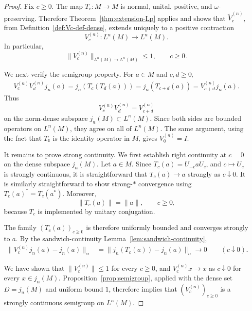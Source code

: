 \documentclass[11pt,a4paper]{article}
\theoremstyle{plain}
\numberwithin{theorem}{section}
\theoremstyle{definition}
\newcommand{\?}{\overset{?}{=}}
\begin{document}
\begin{proof}
Fix \(c\geq0\).  The map \(T_c:M\to M\) is normal, unital, positive,
and \(\omega\)-preserving.  Therefore
Theorem~\ref{thm:extension-Lp} applies and shows that $\widetilde V_c^{(n)}$, from Definition~\ref{def:Vc-def-dense},
extends uniquely to a positive contraction
\[
        V_c^{(n)}:L^n(M)\longrightarrow L^n(M).
\]
In particular,
\begin{equation}
\label{eq:V-contraction}
        \|V_c^{(n)}\|_{L^n(M)\to L^n(M)}
        \leq1,
        \qquad c\geq0.
\end{equation}

We next verify the semigroup property.  For \(a\in M\) and \(c,d\geq0\),
\begin{align*}
        V_c^{(n)}V_d^{(n)}j_n(a)=
        j_n(T_c(T_d(a)))=
        j_n(T_{c+d}(a))=
        V_{c+d}^{(n)}j_n(a).
\end{align*}
Thus
\[
        V_c^{(n)}V_d^{(n)}
        =
        V_{c+d}^{(n)}
\]
on the norm-dense subspace \(j_n(M)\subset L^n(M)\).  Since both sides are
bounded operators on \(L^n(M)\), they agree on all of \(L^n(M)\).  The same
argument, using the fact that \(T_0\) is the identity operator in $M$, gives
\(V_0^{(n)}=I\).

It remains to prove strong continuity.  We first establish right continuity
at \(c=0\) on the dense subspace \(j_n(M)\).  Let \(a\in M\).  Since $T_c(a)=U_{-c}aU_c$,
and \(c\mapsto U_c\) is strongly continuous,  it is straightforward that $T_c(a) \to a$ strongly as $c\downarrow0$.
It is similarly straightforward to show strong-\(*\) convergence using
\(T_c(a)^*=T_c(a^*)\).  Moreover,
\[
        \|T_c(a)\|=\|a\|,
        \qquad c\geq0,
\]
because \(T_c\) is implemented by unitary conjugation.

The family \((T_c(a))_{c\geq0}\) is therefore uniformly bounded and
converges strongly to \(a\).  By the sandwich-continuity
Lemma~\ref{lem:sandwich-continuity},
\begin{align}
        \|V_c^{(n)}j_n(a)-j_n(a)\|_n
        &=
        \|j_n(T_c(a))-j_n(a)\|_n
        \longrightarrow0
        \qquad(c\downarrow0).                         \label{eq:V-core-cont}
\end{align}

We have shown that \(\|V_c^{(n)}\|\leq1\) for every \(c\geq0\), and \(V_c^{(n)}x\to x\) as \(c\downarrow0\) for every \(x\in j_n(M)\). Proposition~\ref{prop:semigroup}, applied with the dense set \(D=j_n(M)\) and uniform bound \(1\), therefore implies that
\((V_c^{(n)})_{c\geq0}\) is a strongly continuous semigroup on
\(L^n(M)\).
\end{proof}
\end{document}
